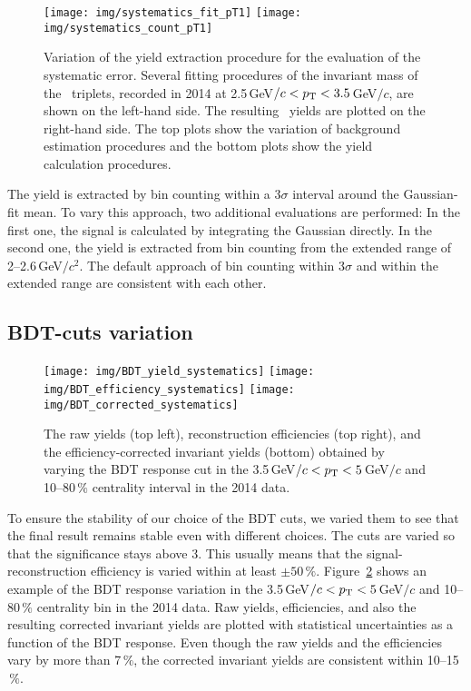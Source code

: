 \begin{figure}[!htb]
\centering
\texttt{[image: img/systematics\_fit\_pT1]}
\texttt{[image: img/systematics\_count\_pT1]}
\caption[Variation of the yield extraction procedure for the evaluation of the systematic error]{\label{syst_pT1} Variation of the yield extraction procedure for the evaluation of the systematic error. Several fitting procedures of the invariant mass of the \pKpi\ triplets, recorded in 2014 at 2.5$\,$GeV$/c < {p_{\mathrm{T}}} < 3.5\,$GeV$/c$, are shown on the left-hand side\@. The resulting \Lambdac\ yields are plotted on the right-hand side. The top plots show the variation of background estimation procedures and the bottom plots show the yield calculation procedures.}
\end{figure}

The yield is extracted by bin counting within a 3$\sigma$ interval around the Gaussian-fit mean. To vary this approach, two additional evaluations are performed: In the first one, the signal is calculated by integrating the Gaussian directly. In the second one, the yield is extracted from bin counting from the extended range of 2--2.6$\,$GeV$/c^2$\@. The default approach of bin counting within 3$\sigma$ and within the extended range are consistent with each other.



\subsection{BDT-cuts variation}

\begin{figure}[!htb]
\centering
\texttt{[image: img/BDT\_yield\_systematics]}
\texttt{[image: img/BDT\_efficiency\_systematics]}
\texttt{[image: img/BDT\_corrected\_systematics]}
\caption[The raw yields, reconstruction efficiencies, and the efficiency-corrected invariant yields obtained by varying the BDT response cut.]{\label{BDT_systematics} The raw yields (top left), reconstruction efficiencies (top right), and the efficiency-corrected invariant yields (bottom) obtained by varying the BDT response cut in the 3.5$\,$GeV$/c < {p_{\mathrm{T}}} < 5\,$GeV$/c$ and 10--80$\,\%$ centrality interval in the 2014 data.}
\end{figure}

To ensure the stability of our choice of the BDT cuts, we varied them to see that the final result remains stable even with different choices. The cuts are varied so that the significance stays above 3\@. This usually means that the signal-reconstruction efficiency is varied within at least $\pm 50\,\%$\@. Figure~\ref{BDT_systematics} shows an example of the BDT response variation in the 3.5$\,$GeV$/c < {p_{\mathrm{T}}} < 5\,$GeV$/c$ and 10--80$\,\%$ centrality bin in the 2014 data. Raw yields, efficiencies, and also the resulting corrected invariant yields are plotted with statistical uncertainties as a function of the BDT response. Even though the raw yields and the efficiencies vary by more than 7$\,\%$, the corrected invariant yields are consistent within 10--15$\,\%$\@.


